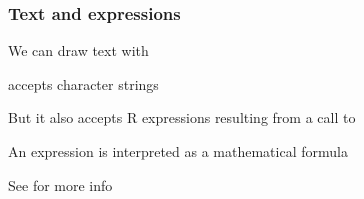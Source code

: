 \documentclass[12pt]{beamer}\usepackage[]{graphicx}\usepackage[]{color}
\begin{document}

\begin{frame}
\begin{center}
\Huge{}
\end{center}
\end{frame}


\begin{frame}
\frametitle{Text and expressions}

\bi
  \item We can draw text with 
  \item {} accepts character strings
  \item But it also accepts R expressions resulting from a call to {\hilit {}}
  \item An expression is interpreted as a mathematical formula
  \item See  for more info
\ei

\end{frame}

\end{document}
